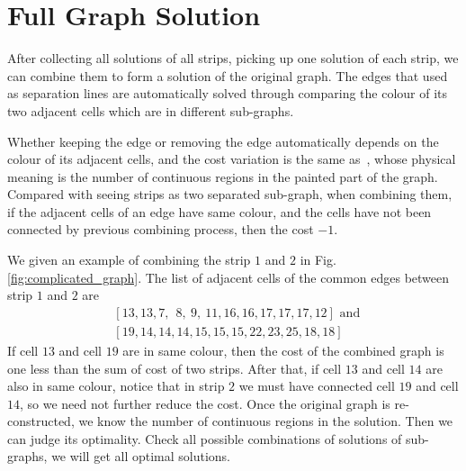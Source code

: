\documentclass[conference]{IEEEtran}
\begin{document}
\section{Full Graph Solution}\label{section_full_graph}
After collecting all solutions of all strips, picking up one solution of each strip, we can combine them to form a solution of the original graph. 
The edges that used as separation lines are automatically solved through comparing the colour of its two adjacent cells which are in different sub-graphs. 

Whether keeping the edge or removing the edge automatically depends on the colour of its adjacent cells, and the cost variation is the same as~\cite{Yang2020Cellular}, whose physical meaning is the number of continuous regions in the painted part of the graph. 
Compared with seeing strips as two separated sub-graph, when combining them, if the adjacent cells of an edge have same colour, and the cells have not been connected by previous combining process, then the cost $-1$.  

We given an example of combining the strip $1$ and $2$ in Fig.\ref{fig:complicated_graph}. 
The list of adjacent cells of the common edges between strip $1$ and $2$ are 
\begin{equation}
\begin{aligned}
&[13, 13, 7,~~  8,~  9,~  11, 16, 16, 17, 17, 17, 12] \mbox{ and }\\
&[19, 14, 14, 14, 15, 15, 15, 22, 23, 25, 18, 18]
\end{aligned}
\end{equation}
If cell $13$ and cell $19$ are in same colour, then the cost of the combined graph is one less than the sum of cost of two strips. After that, if cell $13$ and cell $14$ are also in same colour, notice that in strip $2$ we must have connected cell $19$ and cell $14$, so we need not further reduce the cost. 
Once the original graph is re-constructed, we know the number of continuous regions in the solution. Then we can judge its optimality. Check all possible combinations of solutions of sub-graphs, we will get all optimal solutions. 
\end{document}
